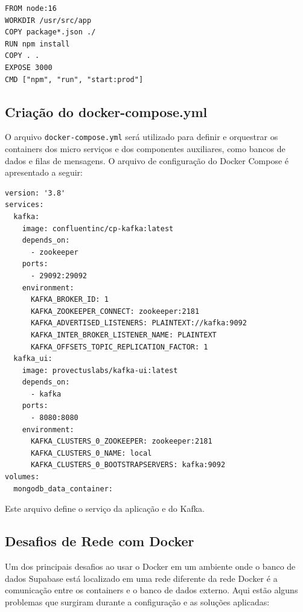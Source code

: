 \begin{verbatim}
FROM node:16
WORKDIR /usr/src/app
COPY package*.json ./
RUN npm install
COPY . .
EXPOSE 3000
CMD ["npm", "run", "start:prod"]
\end{verbatim}

\subsection{Criação do docker-compose.yml}
O arquivo \texttt{docker-compose.yml} será utilizado para definir e orquestrar os containers dos micro serviços e dos componentes auxiliares, como bancos de dados e filas de mensagens. O arquivo de configuração do Docker Compose é apresentado a seguir:

\begin{verbatim}
version: '3.8'
services:
  kafka:
    image: confluentinc/cp-kafka:latest
    depends_on:
      - zookeeper
    ports:
      - 29092:29092
    environment:
      KAFKA_BROKER_ID: 1
      KAFKA_ZOOKEEPER_CONNECT: zookeeper:2181
      KAFKA_ADVERTISED_LISTENERS: PLAINTEXT://kafka:9092
      KAFKA_INTER_BROKER_LISTENER_NAME: PLAINTEXT
      KAFKA_OFFSETS_TOPIC_REPLICATION_FACTOR: 1
  kafka_ui:
    image: provectuslabs/kafka-ui:latest
    depends_on:
      - kafka
    ports:
      - 8080:8080
    environment:
      KAFKA_CLUSTERS_0_ZOOKEEPER: zookeeper:2181
      KAFKA_CLUSTERS_0_NAME: local
      KAFKA_CLUSTERS_0_BOOTSTRAPSERVERS: kafka:9092
volumes:
  mongodb_data_container:
\end{verbatim}

Este arquivo define o serviço da aplicação e do Kafka.

\subsection{Desafios de Rede com Docker}

Um dos principais desafios ao usar o Docker em um ambiente onde o banco de dados Supabase está localizado em uma rede diferente da rede Docker é a comunicação entre os containers e o banco de dados externo. Aqui estão alguns problemas que surgiram durante a configuração e as soluções aplicadas:

